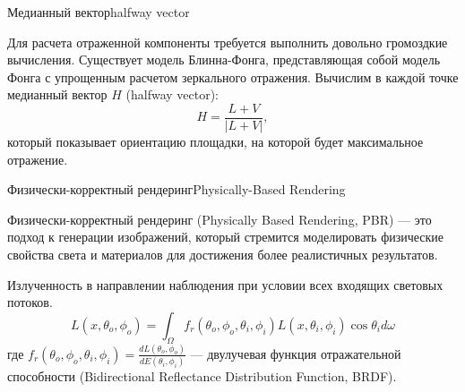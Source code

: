 \documentclass{beamer}
\begin{document}
	\begin{frame}{Медианный вектор}{halfway vector}
		
		Для расчета отраженной компоненты требуется выполнить довольно громоздкие вычисления. Существует модель Блинна-Фонга, представляющая собой модель Фонга с упрощенным расчетом зеркального отражения. Вычислим в каждой точке медианный вектор ${H}$ (halfway vector):
		\[
			H=\frac{L+V}{|L+V|}
			,
		\]
		который показывает ориентацию площадки, на которой будет максимальное отражение. 
	\end{frame}


		\begin{frame}{Физически-корректный рендеринг}{Physically-Based Rendering}
	
		Физически-корректный рендеринг (Physically Based Rendering, PBR) --- это подход к генерации изображений, который стремится моделировать физические свойства света и материалов для достижения более реалистичных результатов.

		Излученность в направлении наблюдения при условии всех входящих световых потоков. 
		\[
			L(x, \theta_o, \phi_o) = 
			\int_{\Omega} 
			f_r(\theta_o, \phi_o, \theta_i, \phi_i) 
			L(x, \theta_i, \phi_i) 
			\cos \theta_i d \omega
		\]
		где 
		$
			f_r
			(\theta_o, \phi_o, \theta_i, \phi_i) =
			\frac{d L(\theta_o, \phi_o)}{d E (\theta_i, \phi_i)}
		$ --- двулучевая функция отражательной способности (Bidirectional Reflectance Distribution Function, BRDF).
		

	\end{frame}
\end{document}
